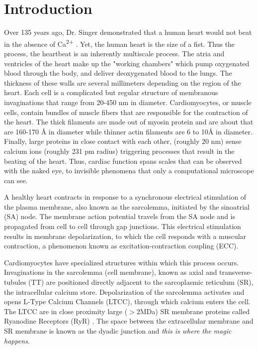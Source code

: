 \documentclass[12pt]{ucsddissertation}
\begin{document}
\section{Introduction}
 Over 135 years ago, Dr. Singer demonstrated that a human heart would not beat in the absence of Ca\textsuperscript{2+} \cite{Ringer1883}. Yet, the human heart is the size of a fist. Thus the process, the heartbeat is an inherently multiscale process. The atria and ventricles of the heart make up the "working chambers" which pump oxygenated blood through the body, and deliver deoxygenated blood to the lungs. The thickness of these walls are several millimeters depending on the region of the heart. Each cell is a complicated but regular structure of membranous invaginations that range from 20-450 nm in diameter. Cardiomyocytes, or muscle cells, contain bundles of muscle fibers that are responsible for the contraction of the heart. The thick filaments are made out of myosin protein and are about that are 160-170 \si{\angstrom} in diameter while thinner actin filaments are 6 to 10\si{\angstrom} in diameter. Finally, large proteins in close contact with each other, (roughly 20 nm) sense calcium ions (roughly 231 pm radius) triggering processes that result in the beating of the heart. Thus, cardiac function spans scales that can be observed with the naked eye, to invisible phenomena that only a computational microscope can see.  

 A healthy heart contracts in response to a synchronous electrical stimulation of the plasma membrane, also known as the sarcolemma, initiated by the sinoatrial (SA) node. The membrane action potential travels from the SA node and is propagated from cell to cell through gap junctions\cite{Bernstein2006}. This electrical stimulation results in membrane depolarization, to which the cell responds with a muscular contraction, a phenomenon known as  excitation-contraction coupling (ECC)\cite{Cheng1994}. 
 
 Cardiomyocytes have specialized structures within which this process occurs. Invaginations in the sarcolemma (cell membrane), known as axial and transverse-tubules (TT) are positioned directly adjacent to the sarcoplasmic reticulum (SR), the intracellular calcium store. Depolarization of the sarcolemma activates and opens L-Type Calcium Channels (LTCC), through which calcium enters the cell. The LTCC are in close proximity large ($>2$MDa) SR membrane proteins called Ryanodine Receptors (RyR) \cite{Lanner2010}. The space between the extracellular membrane and SR membrane is known as the dyadic junction and \textit{this is where the magic happens}.
\end{document}
